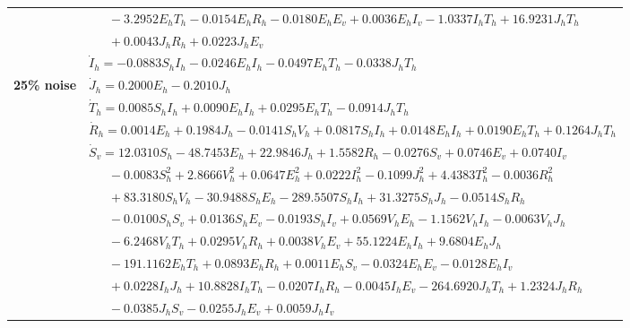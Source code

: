 \documentclass[9pt]{article}
\numberwithin{equation}{section}
\begin{document}
\begin{table}[ht]
\begin{tabularx}{1\linewidth}{|l|X|}
        & $\quad\;\;-3.2952E_hT_h-0.0154E_hR_h-0.0180E_hE_v+0.0036E_hI_v-1.0337I_hT_h+16.9231J_hT_h$ \\
        & $\quad\;\;+0.0043J_hR_h+0.0223J_hE_v$ \\
        & $\dot{I}_h=-0.0883S_hI_h-0.0246E_hI_h-0.0497E_hT_h-0.0338J_hT_h$ \\
        \textbf{25\% noise} & $\dot{J}_h=0.2000E_h-0.2010J_h$ \\
        & $\dot{T}_h=0.0085S_hI_h+0.0090E_hI_h+0.0295E_hT_h-0.0914J_hT_h$ \\
        & $\dot{R}_h=0.0014E_h+0.1984J_h-0.0141S_hV_h+0.0817S_hI_h+0.0148E_hI_h+0.0190E_hT_h+0.1264J_hT_h$ \\
        & $\dot{S}_v=12.0310S_h-48.7453E_h+22.9846J_h+1.5582R_h-0.0276S_v+0.0746E_v+0.0740I_v$ \\
        & $\quad\;\;-0.0083S_h^2+2.8666V_h^2+0.0647E_h^2+0.0222I_h^2-0.1099J_h^2+4.4383T_h^2-0.0036R_h^2$ \\
        & $\quad\;\;+83.3180S_hV_h-30.9488S_hE_h-289.5507S_hI_h+31.3275S_hJ_h-0.0514S_hR_h$ \\
        & $\quad\;\;-0.0100S_hS_v+0.0136S_hE_v-0.0193S_hI_v+0.0569V_hE_h-1.1562V_hI_h-0.0063V_hJ_h$ \\
        & $\quad\;\;-6.2468V_hT_h+0.0295V_hR_h+0.0038V_hE_v+55.1224E_hI_h+9.6804E_hJ_h$ \\
        & $\quad\;\;-191.1162E_hT_h+0.0893E_hR_h+0.0011E_hS_v-0.0324E_hE_v-0.0128E_hI_v$ \\
        & $\quad\;\;+0.0228I_hJ_h+10.8828I_hT_h-0.0207I_hR_h-0.0045I_hE_v-264.6920J_hT_h+1.2324J_hR_h$ \\
        & $\quad\;\;-0.0385J_hS_v-0.0255J_hE_v+0.0059J_hI_v$ \\
    \end{tabularx}
\end{table}
\end{document}
